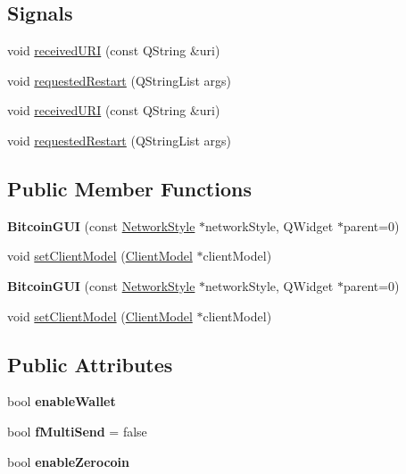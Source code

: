 \subsection*{Signals}
\begin{DoxyCompactItemize}
\item 
void \mbox{\hyperlink{class_bitcoin_g_u_i_a15d55a3b292c9eec64298797d262fa32}{received\+U\+RI}} (const Q\+String \&uri)
\item 
void \mbox{\hyperlink{class_bitcoin_g_u_i_aa16b27ff0eab480255ba86b7d0486034}{requested\+Restart}} (Q\+String\+List args)
\item 
void \mbox{\hyperlink{class_bitcoin_g_u_i_a15d55a3b292c9eec64298797d262fa32}{received\+U\+RI}} (const Q\+String \&uri)
\item 
void \mbox{\hyperlink{class_bitcoin_g_u_i_aa16b27ff0eab480255ba86b7d0486034}{requested\+Restart}} (Q\+String\+List args)
\end{DoxyCompactItemize}
\subsection*{Public Member Functions}
\begin{DoxyCompactItemize}
\item 
\mbox{\label{class_bitcoin_g_u_i_a2598b4ffab4a206877bee80916cc775c}} 
{\bfseries Bitcoin\+G\+UI} (const \mbox{\hyperlink{class_network_style}{Network\+Style}} $\ast$network\+Style, Q\+Widget $\ast$parent=0)
\item 
void \mbox{\hyperlink{class_bitcoin_g_u_i_a99d71e1f8478ab937ce2522c8d3815e3}{set\+Client\+Model}} (\mbox{\hyperlink{class_client_model}{Client\+Model}} $\ast$client\+Model)
\item 
\mbox{\label{class_bitcoin_g_u_i_a2598b4ffab4a206877bee80916cc775c}} 
{\bfseries Bitcoin\+G\+UI} (const \mbox{\hyperlink{class_network_style}{Network\+Style}} $\ast$network\+Style, Q\+Widget $\ast$parent=0)
\item 
void \mbox{\hyperlink{class_bitcoin_g_u_i_a99d71e1f8478ab937ce2522c8d3815e3}{set\+Client\+Model}} (\mbox{\hyperlink{class_client_model}{Client\+Model}} $\ast$client\+Model)
\end{DoxyCompactItemize}
\subsection*{Public Attributes}
\begin{DoxyCompactItemize}
\item 
\mbox{\label{class_bitcoin_g_u_i_abc2a8a6cce2f0fb9cd56eeaea0ef48cf}} 
bool {\bfseries enable\+Wallet}
\item 
\mbox{\label{class_bitcoin_g_u_i_ab188e3f31bda6bc0f26d6b32b42f8760}} 
bool {\bfseries f\+Multi\+Send} = false
\item 
\mbox{\label{class_bitcoin_g_u_i_a427faf2c2fa0a8766bb74b3fe87c7167}} 
bool {\bfseries enable\+Zerocoin}
\end{DoxyCompactItemize}
